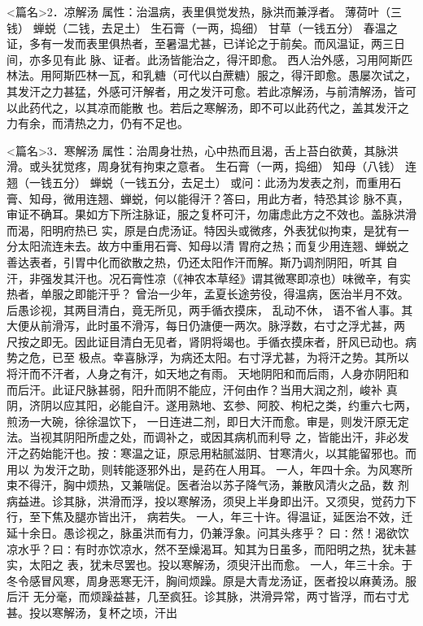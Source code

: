 \documentclass[a4paper,12pt,UTF8,twoside]{ctexbook}
\begin{document}
<篇名>2．凉解汤
属性：治温病，表里俱觉发热，脉洪而兼浮者。 
薄荷叶（三钱） 蝉蜕（二钱，去足土） 生石膏（一两，捣细） 甘草（一钱五分） 
春温之证，多有一发而表里俱热者，至暑温尤甚，已详论之于前矣。而风温证，两三日间，亦多见有此 
脉、证者。此汤皆能治之，得汗即愈。 
西人治外感，习用阿斯匹林法。用阿斯匹林一瓦，和乳糖（可代以白蔗糖）服之，得汗即愈。愚屡次试之， 
其发汗之力甚猛，外感可汗解者，用之发汗可愈。若此凉解汤，与前清解汤，皆可以此药代之，以其凉而能散 
也。若后之寒解汤，即不可以此药代之，盖其发汗之力有余，而清热之力，仍有不足也。 


<篇名>3．寒解汤
属性：治周身壮热，心中热而且渴，舌上苔白欲黄，其脉洪滑。或头犹觉疼，周身犹有拘束之意者。 
生石膏（一两，捣细） 知母（八钱） 连翘（一钱五分） 蝉蜕（一钱五分，去足土） 
或问∶此汤为发表之剂，而重用石膏、知母，微用连翘、蝉蜕，何以能得汗？答曰，用此方者，特恐其诊 
脉不真，审证不确耳。果如方下所注脉证，服之复杯可汗，勿庸虑此方之不效也。盖脉洪滑而渴，阳明府热已 
实，原是白虎汤证。特因头或微疼，外表犹似拘束，是犹有一分太阳流连未去。故方中重用石膏、知母以清 
胃府之热；而复少用连翘、蝉蜕之善达表者，引胃中化而欲散之热，仍还太阳作汗而解。斯乃调剂阴阳，听其 
自汗，非强发其汗也。况石膏性凉（《神农本草经》谓其微寒即凉也）味微辛，有实热者，单服之即能汗乎？ 
曾治一少年，孟夏长途劳役，得温病，医治半月不效。后愚诊视，其两目清白，竟无所见，两手循衣摸床， 
乱动不休， 语不省人事。其大便从前滑泻，此时虽不滑泻，每日仍溏便一两次。脉浮数，右寸之浮尤甚，两 
尺按之即无。因此证目清白无见者，肾阴将竭也。手循衣摸床者，肝风已动也。病势之危，已至 
极点。幸喜脉浮，为病还太阳。右寸浮尤甚，为将汗之势。其所以将汗而不汗者，人身之有汗，如天地之有雨。 
天地阴阳和而后雨，人身亦阴阳和而后汗。此证尺脉甚弱，阳升而阴不能应，汗何由作？当用大润之剂，峻补 
真阴，济阴以应其阳，必能自汗。遂用熟地、玄参、阿胶、枸杞之类，约重六七两，煎汤一大碗，徐徐温饮下， 
一日连进二剂，即日大汗而愈。审是，则发汗原无定法。当视其阴阳所虚之处，而调补之，或因其病机而利导 
之，皆能出汗，非必发汗之药始能汗也。按∶寒温之证，原忌用粘腻滋阴、甘寒清火，以其能留邪也。而用以 
为发汗之助，则转能逐邪外出，是药在人用耳。 
一人，年四十余。为风寒所束不得汗，胸中烦热，又兼喘促。医者治以苏子降气汤，兼散风清火之品，数 
剂病益进。诊其脉，洪滑而浮，投以寒解汤，须臾上半身即出汗。又须臾，觉药力下行，至下焦及腿亦皆出汗， 
病若失。 
一人，年三十许。得温证，延医治不效，迁延十余日。愚诊视之，脉虽洪而有力，仍兼浮象。问其头疼乎？ 
曰∶然！渴欲饮凉水乎？曰∶有时亦饮凉水，然不至燥渴耳。知其为日虽多，而阳明之热，犹未甚实，太阳之 
表，犹未尽罢也。投以寒解汤，须臾汗出而愈。 
一人，年三十余。于冬令感冒风寒，周身恶寒无汗，胸间烦躁。原是大青龙汤证，医者投以麻黄汤。服后汗 
无分毫，而烦躁益甚，几至疯狂。诊其脉，洪滑异常，两寸皆浮，而右寸尤甚。投以寒解汤，复杯之顷，汗出 
\end{document}
